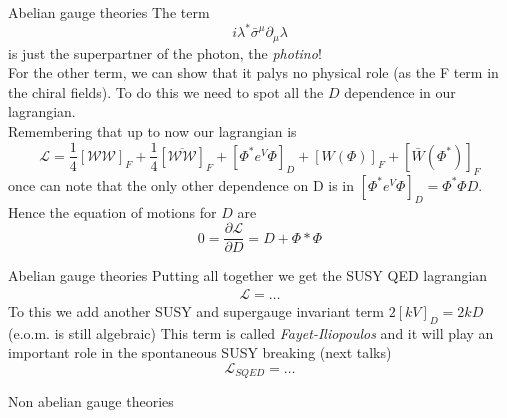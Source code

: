\documentclass[10pt]{beamer}
\begin{document}
\begin{frame}{Abelian gauge theories}
The term 
\begin{equation*}
    i\lambda^* \bar\sigma^{\mu}\partial_{\mu} \lambda
\end{equation*}
is just the superpartner of the photon, the \emph{photino}! \\
For the other term, we can show that it palys no physical role (as the F term in the chiral fields). To do this we need to spot all the $D$ dependence in our lagrangian. \\
Remembering that up to now our lagrangian is 
\begin{equation*}
    \mathcal{L} = \frac{1}{4}\left[\mathcal{WW}\right]_F + \frac{1}{4} \left[\overline{\mathcal{WW}}\right]_F + \left[\Phi^* e^V \Phi\right]_D + [W(\Phi)]_F + [\bar W(\Phi^*)]_F
\end{equation*}
once can note that the only other dependence on D is in $\left[\Phi^* e^V \Phi \right]_D = \Phi^*\Phi D$.
Hence the equation of motions for $D$ are
\begin{equation*}
    0 = \frac{\partial \mathcal{L}}{\partial D} = D + \Phi* \Phi 
\end{equation*}
\end{frame}

\begin{frame}{Abelian gauge theories}
    Putting all together we get the SUSY QED lagrangian 
    \begin{gather*}
        \mathcal{L} = \dots
    \end{gather*}
    To this we add another SUSY and supergauge invariant term $2[kV]_D = 2kD$ (e.o.m. is still algebraic)
    This term is called \emph{Fayet-Iliopoulos} and it will play an important role in the spontaneous SUSY breaking (next talks)
    \begin{equation*}
        \boxed{\mathcal{L}_{SQED} = \dots}
    \end{equation*}
\end{frame}

\begin{frame}{Non abelian gauge theories}
    
\end{frame}
\end{document}
